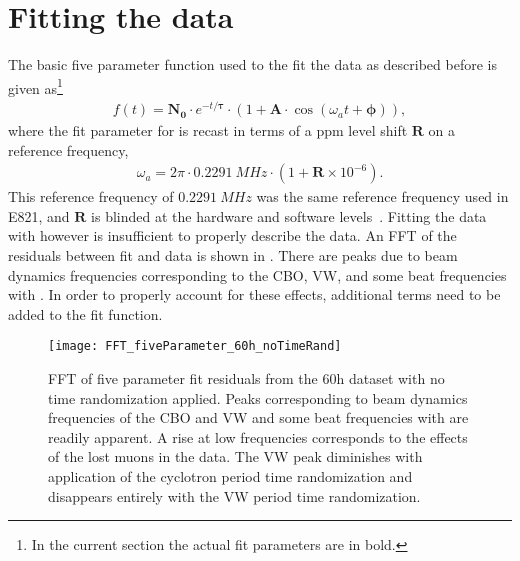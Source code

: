 \section{Fitting the data}
\label{sec:Fitting}


The basic five parameter function used to the fit the data as described before is given as\footnote{In the current section the actual fit parameters are in bold.}
    \begin{align}
        f(t) = \boldsymbol{N_{0}} \cdot e^{-t/\boldsymbol{\tau}} \cdot (1 + \boldsymbol{A} \cdot \cos(\omega_{a}t + \boldsymbol{\phi})),
    \label{eq:fiveparfuncagain}
    \end{align}
where the fit parameter for \wa is recast in terms of a ppm level shift $\boldsymbol{R}$ on a reference frequency,
    \begin{align}
        \omega_{a} = 2 \pi \cdot \SI{0.2291}{MHz} \cdot (1 + \boldsymbol{R} \times 10^{-6}).
    \label{eq:wablind}
    \end{align}
This reference frequency of $\SI{0.2291}{MHz}$ was the same reference frequency used in E821, and $\boldsymbol{R}$ is blinded at the hardware and software levels~\cite{ClockManual,SoftwareBlinding}. Fitting the data with  however is insufficient to properly describe the data. An FFT of the residuals between fit and data is shown in . There are peaks due to beam dynamics frequencies corresponding to the CBO, VW, and some beat frequencies with \wa. In order to properly account for these effects, additional terms need to be added to the fit function. 


\begin{figure}[ht]
    \centering
    \texttt{[image: FFT\_fiveParameter\_60h\_noTimeRand]}
    \caption[FFT of five parameter fit residuals]{FFT of five parameter fit residuals from the 60h dataset with no time randomization applied. Peaks corresponding to beam dynamics frequencies of the CBO and VW and some beat frequencies with \wa are readily apparent. A rise at low frequencies corresponds to the effects of the lost muons in the data. The VW peak diminishes with application of the cyclotron period time randomization and disappears entirely with the VW period time randomization.}
    \label{fig:FFT_fiveParameter}
\end{figure}


